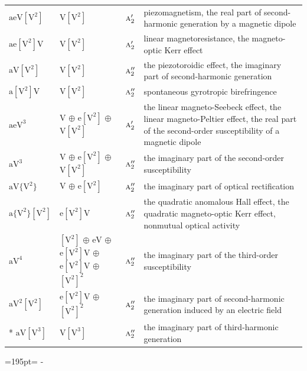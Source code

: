 \documentclass[10pt,a4paper]{article}
\newcommand{\needspace}[1]{\par\penalty-100\begingroup\dimen0=#1\relax\dimen2=\pagegoal
  \advance\dimen2-\pagetotal\ifdim\dimen0>\dimen2\relax\ifdim\dimen2>0pt\vfil\break\fi\fi
  \endgroup}
\numberwithin{equation}{section}
\newcommand{\irr}[1]{\text{\normalfont\scshape #1}}
\newcommand{\jahn}[1]{\mathrm{#1}}
\newlength{\fillwidth}\newlength{\cellwidth}\newlength{\colwidth}
\begin{document}
{\begin{longtable}{@{}lll>{\RaggedRight\arraybackslash}p{\fillwidth}@{}}
$\jahn{aeV[V^{2}]}$ & $\jahn{V[V^{2}]}$ & $\irr{a}_{2}'$ & piezomagnetism, the real part of second-harmonic generation by a magnetic dipole\\
$\jahn{ae[V^{2}]V}$ & $\jahn{V[V^{2}]}$ & $\irr{a}_{2}'$ & linear magnetoresistance, the magneto-optic Kerr effect\\
$\jahn{aV[V^{2}]}$ & $\jahn{V[V^{2}]}$ & $\irr{a}_{2}''$ & the piezotoroidic effect, the imaginary part of second-harmonic generation\\
$\jahn{a[V^{2}]V}$ & $\jahn{V[V^{2}]}$ & $\irr{a}_{2}''$ & spontaneous gyrotropic birefringence\\
$\jahn{aeV^{3}}$ & $\jahn{V}$ $\oplus$ $\jahn{e[V^{2}]}$ $\oplus$ $\jahn{V[V^{2}]}$ & $\irr{a}_{2}'$ & the linear magneto-Seebeck effect, the linear magneto-Peltier effect, the real part of the second-order susceptibility of a magnetic dipole\\
$\jahn{aV^{3}}$ & $\jahn{V}$ $\oplus$ $\jahn{e[V^{2}]}$ $\oplus$ $\jahn{V[V^{2}]}$ & $\irr{a}_{2}''$ & the imaginary part of the second-order susceptibility\\
$\jahn{aV\{V^{2}\}}$ & $\jahn{V}$ $\oplus$ $\jahn{e[V^{2}]}$ & $\irr{a}_{2}''$ & the imaginary part of optical rectification\\
$\jahn{a\{V^{2}\}[V^{2}]}$ & $\jahn{e[V^{2}]V}$ & $\irr{a}_{2}''$ & the quadratic anomalous Hall effect, the quadratic magneto-optic Kerr effect, nonmutual optical activity\\
$\jahn{aV^{4}}$ & $\jahn{[V^{2}]}$ $\oplus$ $\jahn{eV}$ $\oplus$ $\jahn{e[V^{2}]V}$ $\oplus$ $\jahn{e[V^{2}]V}$ $\oplus$ $\jahn{[V^{2}]^{2}}$ & $\irr{a}_{2}''$ & the imaginary part of the third-order susceptibility\\
$\jahn{aV^{2}[V^{2}]}$ & $\jahn{e[V^{2}]V}$ $\oplus$ $\jahn{[V^{2}]^{2}}$ & $\irr{a}_{2}''$ & the imaginary part of second-harmonic generation induced by an electric field\\*
$\jahn{aV[V^{3}]}$ & $\jahn{V[V^{3}]}$ & $\irr{a}_{2}''$ & the imaginary part of third-harmonic generation\\
\bottomrule\end{longtable}}
\needspace{195pt}
\end{document}
